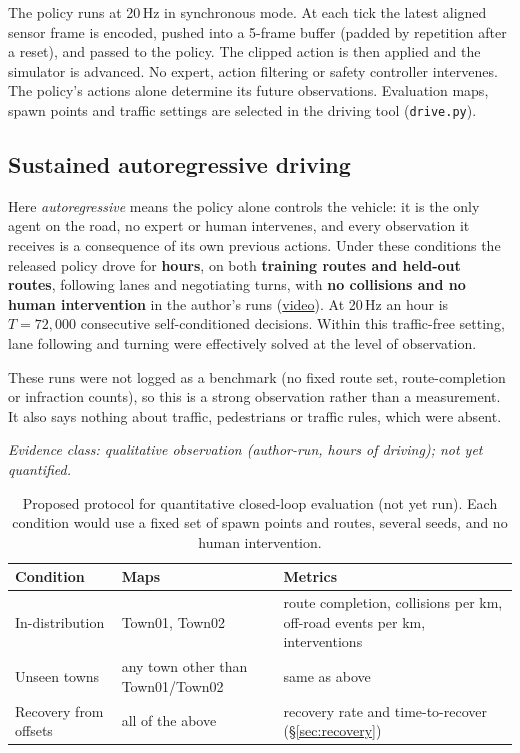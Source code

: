 \documentclass[11pt]{article}
\newcommand{\evidence}[1]{\par\smallskip\noindent\textit{\small Evidence class: #1}\par\smallskip}
\begin{document}
The policy runs at 20\,Hz in synchronous mode. At each tick the latest aligned sensor frame is encoded, pushed into a 5-frame buffer (padded by repetition after a reset), and passed to the policy. The clipped action is then applied and the simulator is advanced. No expert, action filtering or safety controller intervenes. The policy's actions alone determine its future observations. Evaluation maps, spawn points and traffic settings are selected in the driving tool (\texttt{drive.py}).

\subsection{Sustained autoregressive driving}

Here \emph{autoregressive} means the policy alone controls the vehicle: it is the only agent on the road, no expert or human intervenes, and every observation it receives is a consequence of its own previous actions. Under these conditions the released policy drove for \textbf{hours}, on both \textbf{training routes and held-out routes}, following lanes and negotiating turns, with \textbf{no collisions and no human intervention} in the author's runs (\href{https://youtu.be/rr_uS4bf0B4}{video}). At 20\,Hz an hour is $T = 72{,}000$ consecutive self-conditioned decisions. Within this traffic-free setting, lane following and turning were effectively solved at the level of observation.

These runs were not logged as a benchmark (no fixed route set, route-completion or infraction counts), so this is a strong observation rather than a measurement. It also says nothing about traffic, pedestrians or traffic rules, which were absent.

\evidence{qualitative observation (author-run, hours of driving); not yet quantified.}

\begin{table}[!htbp]
  \centering
  \small
  \caption{Proposed protocol for quantitative closed-loop evaluation (not yet run). Each condition would use a fixed set of spawn points and routes, several seeds, and no human intervention.}
  \label{tab:protocol}
  \begin{tabularx}{\linewidth}{@{}l l X@{}}
    \toprule
    Condition & Maps & Metrics \\
    \midrule
    In-distribution & Town01, Town02 & route completion, collisions per km, off-road events per km, interventions \\
    Unseen towns & any town other than Town01/Town02 & same as above \\
    Recovery from offsets & all of the above & recovery rate and time-to-recover (\S\ref{sec:recovery}) \\
    \bottomrule
  \end{tabularx}
\end{table}
\end{document}
